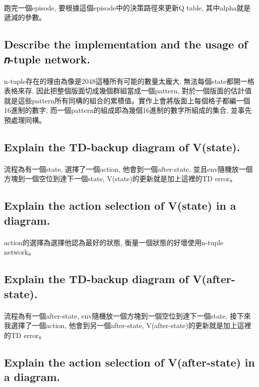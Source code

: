 \paragraph{}
跑完一個episode, 要根據這個episode中的決策路徑來更新Q table, 其中alpha就是遞減的參數。
\subsection{Describe the implementation and the usage of 𝑛-tuple network.}
\paragraph{}
n-tuple存在的理由為像是2048這種所有可能的數量太龐大, 無法每個state都開一格表格來存, 因此把整個版面切成幾個群組當成一個pattern, 對於一個版面的估計值就是這些pattern所有同構的組合的累積值。實作上會將版面上每個格子都編一個16進制的數字, 而一個pattern的組成即為幾個16進制的數字所組成的集合, 並事先預處理同構。
\subsection{Explain the TD-backup diagram of V(state).}
\paragraph{}
流程為有一個state, 選擇了一個action, 他會到一個after-state, 並且env隨機放一個方塊到一個空位到達下一個state, V(state)的更新就是加上這裡的TD error。
\subsection{Explain the action selection of V(state) in a diagram.}
\paragraph{}
action的選擇為選擇他認為最好的狀態, 衡量一個狀態的好壞使用n-tuple network。
\subsection{Explain the TD-backup diagram of V(after-state).}
\paragraph{}
流程為有一個after-state, env隨機放一個方塊到一個空位到達下一個state, 接下來我選擇了一個action, 他會到另一個after-state, V(after-state)的更新就是加上這裡的TD error。
\subsection{Explain the action selection of V(after-state) in a diagram.}
